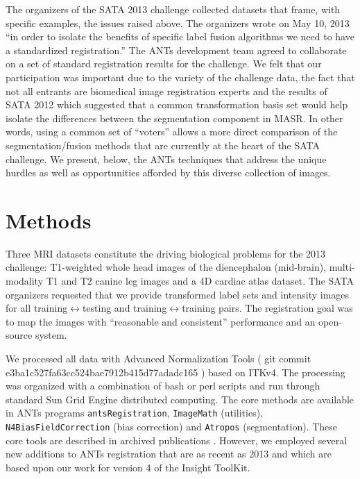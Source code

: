 \documentclass{llncs}
\begin{document}
The organizers of the SATA 2013 challenge collected datasets that
frame, with specific examples, the issues raised above.  The
organizers wrote on May 10, 2013 ``in order to isolate the benefits of
specific label fusion algorithms we need to have a standardized
registration.''  The ANTs development team agreed to collaborate on a set of standard registration results for the challenge.  We
felt that our participation was important due to the variety of the challenge
data, the fact that not all entrants are biomedical image registration
experts and the results of SATA 2012 which suggested that a common
transformation basis set would help isolate the differences between
the segmentation component in MASR.  In other words, using a common
set of ``voters'' allows a more direct comparison of the
segmentation/fusion methods that are currently at the heart of the
SATA challenge. We present,
below, the ANTs techniques that address the unique hurdles as well as
opportunities afforded by this diverse collection of images.

\section{Methods} Three MRI datasets constitute the driving biological
problems for the 2013 challenge: T1-weighted whole head images of the
diencephalon (mid-brain), multi-modality T1 and T2 canine leg images
and a 4D cardiac atlas dataset.  The SATA organizers requested that we
provide transformed label sets and intensity images for all
training$\leftrightarrow$testing and training$\leftrightarrow$training
pairs.  The registration goal was to map the images with ``reasonable
and consistent'' performance and an open-source system.

We processed all data with Advanced Normalization Tools ( git commit
e3ba1c527fa63cc524bae7912b415d77adadc165 ) based on ITKv4.  The
processing was organized with a combination of bash or perl scripts
and run through standard Sun Grid Engine distributed computing.  The
core methods are available in ANTs programs \texttt{antsRegistration},
\texttt{ImageMath} (utilities), \texttt{N4BiasFieldCorrection} (bias
correction) and \texttt{Atropos} (segmentation).  These core tools are
described in archived publications
\cite{Tustison2010,Avants2011a,Avants2011}.  However, we employed
several new additions to ANTs registration that are as recent as 2013
and which are based upon our work for version 4 of the Insight
ToolKit.
\end{document}
